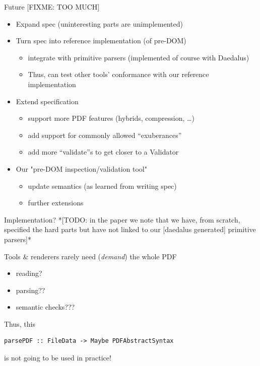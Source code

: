 \documentclass[t,10pt,xcolor={dvipsnames}]{beamer}
\begin{document}
\begin{frame}[label={sec:org37dd046}]{Future [FIXME: TOO MUCH]}
\begin{itemize}
\item Expand spec (uninteresting parts are unimplemented)
\item Turn spec into reference implementation (of pre-DOM)
\begin{itemize}
\item integrate with primitive parsers (implemented of course with Daedalus)
\item Thus, can test other tools’ conformance with our reference implementation
\end{itemize}
\item Extend specification
\begin{itemize}
\item support more PDF features (hybrids, compression, …)
\item add support for commonly allowed “exuberances”
\item add more “validate”s to get closer to a Validator
\end{itemize}
\item Our "pre-DOM inspection/validation tool"
\begin{itemize}
\item update semantics (as learned from writing spec)
\item further extensions
\end{itemize}
\end{itemize}
\end{frame}

\begin{frame}[label={sec:org5cfe6ee},fragile]{Implementation?}
 *[TODO: in the paper we note that we have, from scratch,
specified the hard parts but have not linked to our [daedalus generated]
primitive parsers]*

Tools \& renderers rarely need (\emph{demand}) the whole PDF
\begin{itemize}
\item reading?
\item parsing??
\item semantic checks???
\end{itemize}
\vspace{12pt}

Thus, this
\lstset{language=haskell,label= ,caption= ,captionpos=b,numbers=none}
\begin{lstlisting}
parsePDF :: FileData -> Maybe PDFAbstractSyntax
\end{lstlisting}
is not going to be used in practice!     
\end{frame}
\end{document}
